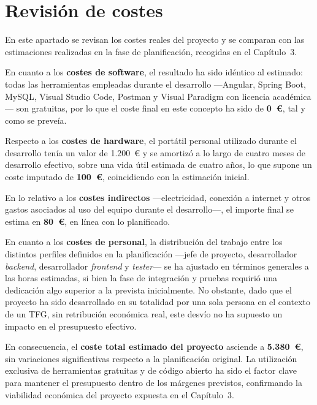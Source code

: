 
\section{Revisión de costes}

En este apartado se revisan los costes reales del proyecto y se comparan con las estimaciones realizadas en la fase de planificación, recogidas en el Capítulo~3.

En cuanto a los \textbf{costes de software}, el resultado ha sido idéntico al estimado: todas las herramientas empleadas durante el desarrollo —Angular, Spring Boot, MySQL, Visual Studio Code, Postman y Visual Paradigm con licencia académica— son gratuitas, por lo que el coste final en este concepto ha sido de \textbf{0~€}, tal y como se preveía.

Respecto a los \textbf{costes de hardware}, el portátil personal utilizado durante el desarrollo tenía un valor de 1.200~€ y se amortizó a lo largo de cuatro meses de desarrollo efectivo, sobre una vida útil estimada de cuatro años, lo que supone un coste imputado de \textbf{100~€}, coincidiendo con la estimación inicial.

En lo relativo a los \textbf{costes indirectos} —electricidad, conexión a internet y otros gastos asociados al uso del equipo durante el desarrollo—, el importe final se estima en \textbf{80~€}, en línea con lo planificado.

En cuanto a los \textbf{costes de personal}, la distribución del trabajo entre los distintos perfiles definidos en la planificación —jefe de proyecto, desarrollador \textit{backend}, desarrollador \textit{frontend} y \textit{tester}— se ha ajustado en términos generales a las horas estimadas, si bien la fase de integración y pruebas requirió una dedicación algo superior a la prevista inicialmente. No obstante, dado que el proyecto ha sido desarrollado en su totalidad por una sola persona en el contexto de un TFG, sin retribución económica real, este desvío no ha supuesto un impacto en el presupuesto efectivo.

En consecuencia, el \textbf{coste total estimado del proyecto} asciende a \textbf{5.380~€}, sin variaciones significativas respecto a la planificación original. La utilización exclusiva de herramientas gratuitas y de código abierto ha sido el factor clave para mantener el presupuesto dentro de los márgenes previstos, confirmando la viabilidad económica del proyecto expuesta en el Capítulo~3.

